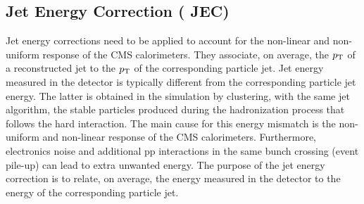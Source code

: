 \subsection{Jet Energy Correction ( JEC)}\label{jec}

Jet energy corrections need to be applied to account for the non-linear and non-uniform response of the CMS calorimeters. They associate, on average, the $p_{\mathrm{T}}$ of a reconstructed jet to the $p_{\mathrm{T}}$ of the corresponding particle jet. Jet energy measured in the detector is typically different from the corresponding particle jet energy. The latter is obtained in the simulation by clustering, with the same jet algorithm, the
stable particles produced during the hadronization process that follows the hard interaction. The main cause for this energy mismatch is the non-uniform and non-linear response of the CMS calorimeters. Furthermore, electronics noise and additional pp interactions in the same bunch crossing (event pile-up) can lead to extra unwanted energy. The purpose of the jet energy correction is to relate, on average, the energy measured in the detector to the energy of the corresponding particle jet.

